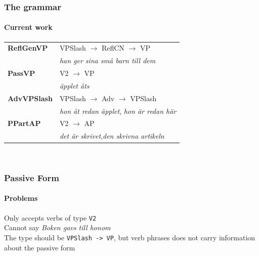 \documentclass[10pt]{beamer}
\renewcommand{\baselinestretch}{1.5}
\begin{document}
\begin{frame}
 \renewcommand{\baselinestretch}{1.5}
\frametitle{The grammar}
\framesubtitle{Current work} 
\begin{tabular}{ll}
\alert{\textbf{ReflGenVP}} & \alert{VPSlash $\rightarrow$ ReflCN $\rightarrow$ VP} \\
& \alert{\emph{han ger sina små barn till dem}} \\
%
{\textbf{PassVP}} & V2 $\rightarrow$ VP \\%
& \emph{äpplet åts} \\ %


\alert{\textbf{AdvVPSlash}} & \alert{VPSlash $\rightarrow$ Adv $\rightarrow$ VPSlash} \\
& \alert{\emph{hon åt redan äpplet}, \emph{hon är redan här}}\\

\alert{\textbf{PPartAP}} & \alert{V2 $\rightarrow$ AP} \\
& \alert{\emph{det är skrivet},\emph{den skrivna artikeln}}
\end{tabular}\\
  
\end{frame}

\begin{frame}[containsverbatim]
\frametitle{Passive Form}
\framesubtitle{Problems} 
Only accepts verbs of type \verb|V2| \\
Cannot say \; \emph{Boken gavs till honom}\\
The type should be \verb|VPSlash -> VP|, but verb phrases does not carry
information about the passive form\\

\end{frame}
\end{document}
